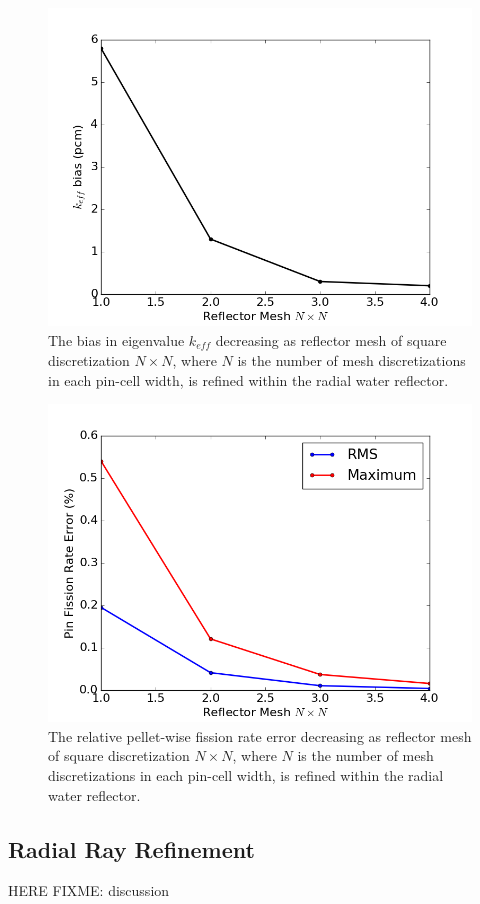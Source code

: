 \begin{figure}[h!]
	\centering
	\includegraphics[width=0.7\linewidth]{figures/results/sensitivity/reflector_mesh_pcm.png}
	\caption[]{The bias in eigenvalue $k_{\textit{eff}}$ decreasing as reflector mesh of square discretization $N \times N$, where $N$ is the number of mesh discretizations in each pin-cell width, is refined within the radial water reflector.}
	\label{fig:rad-ref-pcm}
\end{figure}
\begin{figure}[h!]
	\centering
	\includegraphics[width=0.7\linewidth]{figures/results/sensitivity/reflector_mesh_fr.png}
	\caption[]{The relative pellet-wise fission rate error decreasing as reflector mesh of square discretization $N \times N$, where $N$ is the number of mesh discretizations in each pin-cell width, is refined within the radial water reflector.}
	\label{fig:rad-ref-fr}
\end{figure}

\subsection{Radial Ray Refinement}

HERE
FIXME: discussion

